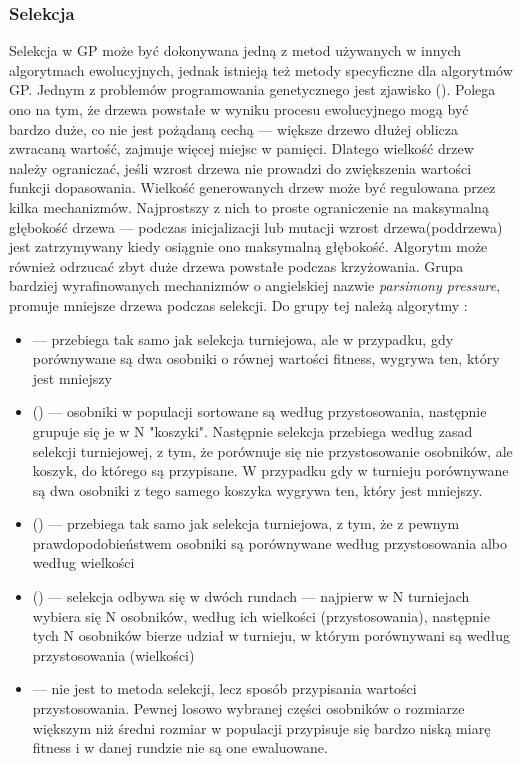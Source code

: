 \subsubsection{Selekcja}
\label{ssec:selekcja-gp}
Selekcja w GP może być dokonywana jedną z metod używanych w innych algorytmach ewolucyjnych, jednak istnieją też metody specyficzne dla algorytmów GP. Jednym z problemów programowania genetycznego jest zjawisko  (). Polega ono na tym, że drzewa powstałe w wyniku procesu ewolucyjnego mogą być bardzo duże, co nie jest pożądaną cechą --- większe drzewo dłużej oblicza zwracaną wartość, zajmuje więcej miejsc w pamięci. Dlatego wielkość drzew należy ograniczać, jeśli wzrost drzewa nie prowadzi do zwiększenia wartości funkcji dopasowania.
Wielkość generowanych drzew może być regulowana przez kilka mechanizmów. Najprostszy z nich to proste ograniczenie na maksymalną głębokość drzewa --- podczas inicjalizacji lub mutacji wzrost drzewa(poddrzewa) jest zatrzymywany kiedy osiągnie ono maksymalną głębokość. Algorytm może również odrzucać zbyt duże drzewa powstałe podczas krzyżowania.
Grupa bardziej wyrafinowanych mechanizmów o angielskiej nazwie \textit{parsimony pressure}, promuje mniejsze drzewa podczas selekcji. Do grupy tej należą algorytmy \cite{sean_ecj_2010}:
\begin{itemize}
	\item {} --- przebiega tak samo jak selekcja turniejowa, ale w przypadku, gdy porównywane są dwa osobniki o równej wartości fitness, wygrywa ten, który jest mniejszy
	\item {} () --- osobniki w populacji sortowane są według przystosowania, następnie grupuje się je w N "koszyki". Następnie selekcja przebiega według zasad selekcji turniejowej, z tym, że porównuje się nie przystosowanie osobników, ale koszyk, do którego są przypisane. W przypadku gdy w turnieju porównywane są dwa osobniki z tego samego koszyka wygrywa ten, który jest mniejszy.
	\item {} () --- przebiega tak samo jak selekcja turniejowa, z tym, że z pewnym prawdopodobieństwem osobniki są porównywane według przystosowania albo według wielkości
	\item {} () --- selekcja odbywa się w dwóch rundach --- najpierw w N turniejach wybiera się N osobników, według ich wielkości (przystosowania), następnie tych N osobników bierze udział w turnieju, w którym porównywani są według przystosowania (wielkości)
	\item {} --- nie jest to metoda selekcji, lecz sposób przypisania wartości przystosowania. Pewnej losowo wybranej części osobników o rozmiarze większym niż średni rozmiar w populacji przypisuje się bardzo niską miarę fitness i w danej rundzie nie są one ewaluowane.
\end{itemize}

